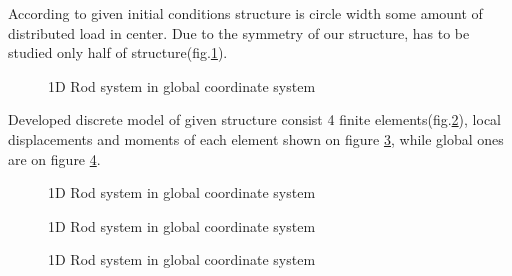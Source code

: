 According to given initial conditions structure is circle width some amount of distributed load in
center. Due to the symmetry of our structure, has to be studied only half of
structure(fig.\ref{fig:halfModel}).
\begin{figure}[H]
    \centering
        
    \caption{1D Rod system in global coordinate system}\label{fig:halfModel}      
\end{figure}
Developed discrete model of given structure consist 4 finite elements(fig.\ref{fig:coords}), local
displacements and moments of each element shown on figure \ref{fig:localDispl}, while global ones
are on figure \ref{fig:globDispl}.
\begin{figure}[H]
    \centering
        
    \caption{1D Rod system in global coordinate system}\label{fig:coords}      
\end{figure}
\begin{figure}[H]
    \centering
        
    \caption{1D Rod system in global coordinate system}\label{fig:localDispl}      
\end{figure}
\begin{figure}[H]
    \centering
        
    \caption{1D Rod system in global coordinate system}\label{fig:globDispl}      
\end{figure}